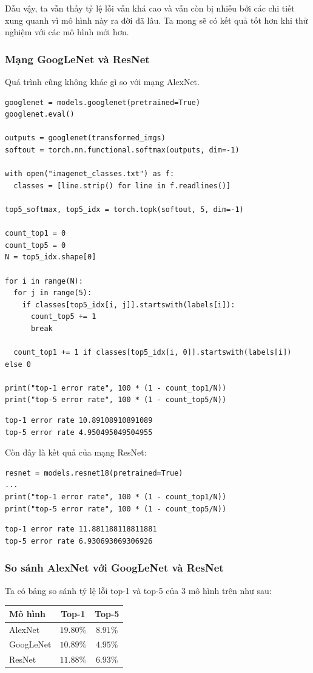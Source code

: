 \documentclass[a4paper]{article}
\begin{document}
\noindent
Dẫu vậy, ta vẫn thấy tỷ lệ lỗi vẫn khá cao và vẫn còn bị nhiễu bởi các chi tiết xung quanh vì mô hình này ra đời đã lâu. Ta mong sẽ có kết quả tốt hơn khi thử nghiệm với các mô hình mới hơn.
\subsubsection{Mạng GoogLeNet và ResNet}
Quá trình cũng không khác gì so với mạng AlexNet.
\begin{lstlisting}
googlenet = models.googlenet(pretrained=True)
googlenet.eval()

outputs = googlenet(transformed_imgs)
softout = torch.nn.functional.softmax(outputs, dim=-1)

with open("imagenet_classes.txt") as f:
  classes = [line.strip() for line in f.readlines()]

top5_softmax, top5_idx = torch.topk(softout, 5, dim=-1)

count_top1 = 0
count_top5 = 0
N = top5_idx.shape[0]

for i in range(N):
  for j in range(5):
    if classes[top5_idx[i, j]].startswith(labels[i]):
      count_top5 += 1
      break

  count_top1 += 1 if classes[top5_idx[i, 0]].startswith(labels[i]) else 0

print("top-1 error rate", 100 * (1 - count_top1/N))
print("top-5 error rate", 100 * (1 - count_top5/N))
\end{lstlisting}
\begin{verbatim}
top-1 error rate 10.89108910891089
top-5 error rate 4.950495049504955
\end{verbatim}
Còn đây là kết quả của mạng ResNet:
\begin{lstlisting}
resnet = models.resnet18(pretrained=True)
...
print("top-1 error rate", 100 * (1 - count_top1/N))
print("top-5 error rate", 100 * (1 - count_top5/N))
\end{lstlisting}
\begin{verbatim}
top-1 error rate 11.881188118811881
top-5 error rate 6.930693069306926
\end{verbatim}
\subsubsection{So sánh AlexNet với GoogLeNet và ResNet}
Ta có bảng so sánh tỷ lệ lỗi top-1 và top-5 của 3 mô hình trên như sau:
\begin{table}[!h]
\centering
{\renewcommand{\arraystretch}{1}
\begin{tabular}{|l|c|c|}
\hline
\textbf{Mô hình} & \textbf{Top-1} & \textbf{Top-5} \\ \hline
AlexNet          & $19.80\%$              & $8.91\%$              \\ \hline
GoogLeNet        & $\mathbf{10.89\%}$              & $\mathbf{4.95\%}$              \\ \hline
ResNet           & $11.88\%$              & $6.93\%$              \\ \hline
\end{tabular}}
\end{table}
\end{document}
